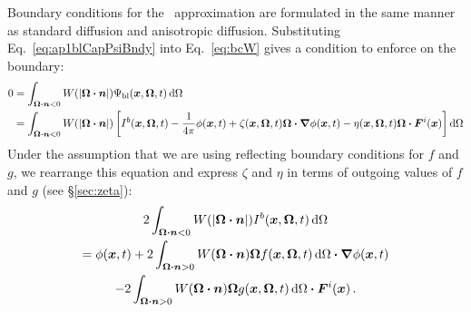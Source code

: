 Boundary conditions for the \APone\ approximation are formulated in the same
manner as standard diffusion and anisotropic diffusion.
Substituting Eq.~\eqref{eq:ap1blCapPsiBndy} into Eq.~\eqref{eq:bcW} gives a
condition to enforce on the boundary:
\begin{align*}
  0 &= \int_{\bm{\Omega} \bm{\cdot} \bm{n} < 0} W(\left| \bm{\Omega} \bm{\cdot} \bm{n} \right|)
  \Psi_\mathrm{bl} (\bm{x}, \bm{\Omega}, t) \mathop{}\!\mathrm{d}\Omega
  \\
  &= \int_{\bm{\Omega} \bm{\cdot} \bm{n} < 0} W(\left| \bm{\Omega} \bm{\cdot} \bm{n} \right|)
 \left[ I^b(\bm{x}, \bm{\Omega}, t) - \frac{1}{4\pi} \phi(\bm{x}, t)
  + \zeta(\bm{x}, \bm{\Omega}, t) \bm{\Omega}\bm{\cdot} \bm{\nabla} \phi(\bm{x}, t)
  - \eta(\bm{x}, \bm{\Omega}, t) \bm{\Omega}\bm{\cdot} \bm{F}^i(\bm{x})\right]
  \mathop{}\!\mathrm{d}\Omega
\end{align*}
Under the assumption that we are using reflecting boundary conditions for $f$
and $g$, we rearrange this equation and express $\zeta$ and $\eta$ in terms of
outgoing values of $f$ and $g$ (see \S\ref{sec:zeta}):
\begin{multline}\label{eq:ap1loBndy}
  2 \int_{\bm{\Omega} \bm{\cdot} \bm{n} < 0} W(\left| \bm{\Omega} \bm{\cdot} \bm{n} \right|)
  I^b(\bm{x}, \bm{\Omega}, t) \mathop{}\!\mathrm{d}\Omega
  \\
  =
 \phi(\bm{x}, t)
  + 2\int_{\bm{\Omega}\bm{\cdot} \bm{n} > 0} W(\bm{\Omega} \bm{\cdot} \bm{n})
  \bm{\Omega} f(\bm{x}, \bm{\Omega},t) \mathop{}\!\mathrm{d}\Omega
  \bm{\cdot} \bm{\nabla} \phi(\bm{x}, t) 
  \\
  - 2\int_{\bm{\Omega}\bm{\cdot} \bm{n} > 0} W(\bm{\Omega} \bm{\cdot} \bm{n})
  \bm{\Omega} g(\bm{x}, \bm{\Omega},t) \mathop{}\!\mathrm{d}\Omega
  \bm{\cdot} \bm{F}^i(\bm{x}) 
  \,.
\end{multline}

